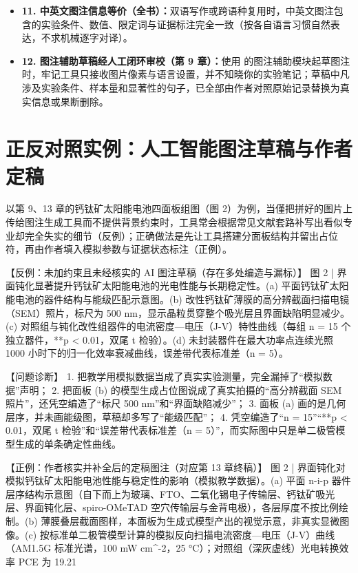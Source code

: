 \begin{itemize}
  \item[$\square$] \textbf{11. 中英文图注信息等价（全书）：}双语写作或跨语种复用时，中英文图注包含的实验条件、数值、限定词与证据标注完全一致（按各自语言习惯自然表达，不求机械逐字对译）。
  \item[$\square$] \textbf{12. 图注辅助草稿经人工闭环审校（第 9 章）：}使用 \scidraw{} 的图注辅助模块起草图注时，牢记工具只接收图片像素与语言设置，并不知晓你的实验笔记；草稿中凡涉及实验条件、样本量和显著性的句子，已全部由作者对照原始记录替换为真实信息或果断删除。
\end{itemize}

\section{正反对照实例：人工智能图注草稿与作者定稿}

以第 9、13 章的钙钛矿太阳能电池四面板组图（图 2）为例，当僅把拼好的图片上传给图注生成工具而不提供背景约束时，工具常会根据常见文献套路补写出看似专业却完全失实的细节（反例）；正确做法是先让工具搭建分面板结构并留出占位符，再由作者填入模拟参数与证据状态标注（正例）。

\begin{Prompt}
【反例：未加约束且未经核实的 AI 图注草稿（存在多处编造与漏标）】
图 2 | 界面钝化显著提升钙钛矿太阳能电池的光电性能与长期稳定性。(a) 平面钙钛矿太阳能电池的器件结构与能级匹配示意图。(b) 改性钙钛矿薄膜的高分辨截面扫描电镜（SEM）照片，标尺为 500 nm，显示晶粒贯穿整个吸光层且界面缺陷明显减少。(c) 对照组与钝化改性组器件的电流密度—电压（J-V）特性曲线（每组 n = 15 个独立器件，**p < 0.01，双尾 t 检验）。(d) 未封装器件在最大功率点连续光照 1000 小时下的归一化效率衰减曲线，误差带代表标准差（n = 5）。

【问题诊断】
1. 把教学用模拟数据当成了真实实验测量，完全漏掉了“模拟数据”声明；
2. 把面板 (b) 的模型生成占位图说成了真实拍摄的“高分辨截面 SEM 照片”，还凭空编造了“标尺 500 nm”和“界面缺陷减少”；
3. 面板 (a) 画的是几何层序，并未画能级图，草稿却多写了“能级匹配”；
4. 凭空编造了“n = 15”“**p < 0.01，双尾 t 检验”和“误差带代表标准差（n = 5）”，而实际图中只是单二极管模型生成的单条确定性曲线。
\end{Prompt}

\begin{Prompt}
【正例：作者核实并补全后的定稿图注（对应第 13 章终稿）】
图 2 | 界面钝化对模拟钙钛矿太阳能电池性能与稳定性的影响（模拟教学数据）。(a) 平面 n-i-p 器件层序结构示意图（自下而上为玻璃、FTO、二氧化锡电子传输层、钙钛矿吸光层、界面钝化层、spiro-OMeTAD 空穴传输层与金背电极），各层厚度不按比例绘制。(b) 薄膜叠层截面图样，本面板为生成式模型产出的视觉示意，非真实显微图像。(c) 按标准单二极管模型计算的模拟反向扫描电流密度—电压（J-V）曲线（AM1.5G 标准光谱，100 mW cm^-2，25 °C）；对照组（深灰虚线）光电转换效率 PCE 为 19.21%
\end{Prompt}

